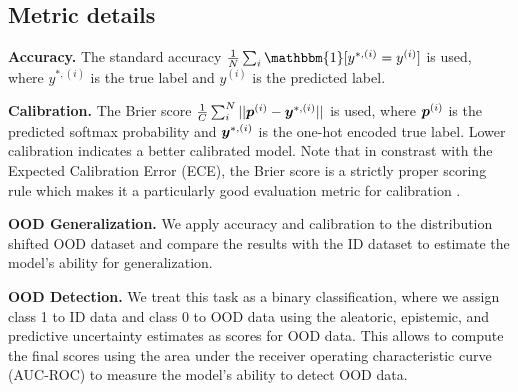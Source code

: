 \subsection{Metric details}
\label{sec:metric_details}


\textbf{Accuracy.} The standard accuracy $\frac{1}{N}\sum_i \mathbbm{1}[y^{*,(i)} = y^{(i)}]$ is used, where $y^{*,(i)}$ is the true label and $y^{(i)}$ is the predicted label. 

\textbf{Calibration.} The Brier score $\frac{1}{C}\sum_i^N||\bm{p}^{(i)} - \bm{y}^{*, (i)}||$ is used, where $\bm{p}^{(i)}$ is the predicted softmax probability and $\bm{y}^{*, (i)}$ is the one-hot encoded true label. Lower calibration indicates a better calibrated model. Note that in constrast with the Expected Calibration Error (ECE), the Brier score is a strictly proper scoring rule which makes it a particularly good evaluation metric for calibration \cite{gneiting2007proper}.

\textbf{OOD Generalization.} We apply accuracy and calibration to the distribution shifted OOD dataset and compare the results with the ID dataset to estimate the model's ability for generalization.

\textbf{OOD Detection.} We treat this task as a binary classification, where we assign class 1 to ID data and class 0 to OOD data using the aleatoric, epistemic, and predictive uncertainty estimates as scores for OOD data. This allows to compute the final scores using the area under the receiver operating characteristic curve (AUC-ROC) to measure the model's ability to detect OOD data. 
